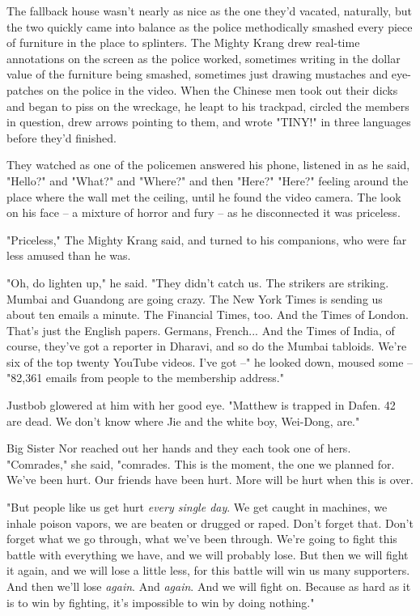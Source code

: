 The fallback house wasn't nearly as nice as the one they'd vacated,
naturally, but the two quickly came into balance as the police
methodically smashed every piece of furniture in the place to
splinters. The Mighty Krang drew real-time annotations on the
screen as the police worked, sometimes writing in the dollar value
of the furniture being smashed, sometimes just drawing mustaches
and eye-patches on the police in the video. When the Chinese men
took out their dicks and began to piss on the wreckage, he leapt to
his trackpad, circled the members in question, drew arrows pointing
to them, and wrote "TINY!" in three languages before they'd
finished.

They watched as one of the policemen answered his phone, listened
in as he said, "Hello?" and "What?" and "Where?" and then "Here?"
"Here?" feeling around the place where the wall met the ceiling,
until he found the video camera. The look on his face -- a mixture
of horror and fury -- as he disconnected it was priceless.

"Priceless," The Mighty Krang said, and turned to his companions,
who were far less amused than he was.

"Oh, do lighten up," he said. "They didn't catch us. The strikers
are striking. Mumbai and Guandong are going crazy. The New York
Times is sending us about ten emails a minute. The Financial Times,
too. And the Times of London. That's just the English papers.
Germans, French... And the Times of India, of course, they've got a
reporter in Dharavi, and so do the Mumbai tabloids. We're six of
the top twenty YouTube videos. I've got --" he looked down, moused
some -- "82,361 emails from people to the membership address."

Justbob glowered at him with her good eye. "Matthew is trapped in
Dafen. 42 are dead. We don't know where Jie and the white boy,
Wei-Dong, are."

Big Sister Nor reached out her hands and they each took one of
hers. "Comrades," she said, "comrades. This is the moment, the one
we planned for. We've been hurt. Our friends have been hurt. More
will be hurt when this is over.

"But people like us get hurt \emph{every single day}. We get caught
in machines, we inhale poison vapors, we are beaten or drugged or
raped. Don't forget that. Don't forget what we go through, what
we've been through. We're going to fight this battle with
everything we have, and we will probably lose. But then we will
fight it again, and we will lose a little less, for this battle
will win us many supporters. And then we'll lose \emph{again}. And
\emph{again}. And we will fight on. Because as hard as it is to win
by fighting, it's impossible to win by doing nothing."

